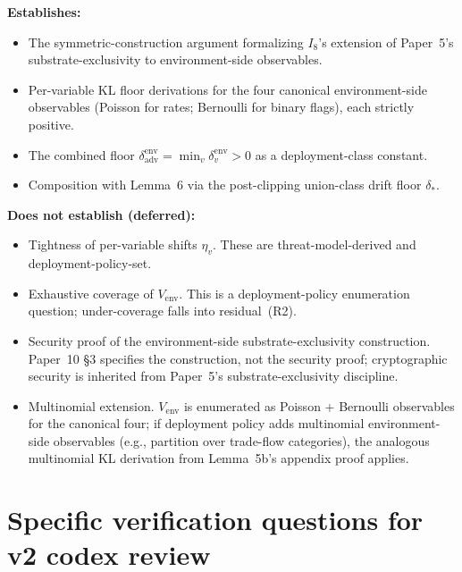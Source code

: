 \documentclass{article}
\newcommand{\deltaadv}{\delta_{\mathrm{adv}}}
\newcommand{\deltastar}{\delta_{*}}
\begin{document}
\textbf{Establishes:}
\begin{itemize}
\item The symmetric-construction argument formalizing $I_8$'s
  extension of Paper~5's substrate-exclusivity to environment-side
  observables.
\item Per-variable KL floor derivations for the four canonical
  environment-side observables (Poisson for rates; Bernoulli for
  binary flags), each strictly positive.
\item The combined floor $\deltaadv^{\mathrm{env}} = \min_v
  \delta_v^{\mathrm{env}} > 0$ as a deployment-class constant.
\item Composition with Lemma~6 via the post-clipping union-class
  drift floor $\deltastar$.
\end{itemize}

\textbf{Does not establish (deferred):}
\begin{itemize}
\item Tightness of per-variable shifts $\eta_v$.  These are
  threat-model-derived and deployment-policy-set.
\item Exhaustive coverage of $V_{\mathrm{env}}$.  This is a
  deployment-policy enumeration question; under-coverage falls into
  residual~(R2).
\item Security proof of the environment-side substrate-exclusivity
  construction.  Paper~10 §3 specifies the construction, not the
  security proof; cryptographic security is inherited from
  Paper~5's substrate-exclusivity discipline.
\item Multinomial extension.  $V_{\mathrm{env}}$ is enumerated as
  Poisson + Bernoulli observables for the canonical four; if
  deployment policy adds multinomial environment-side observables
  (e.g., partition over trade-flow categories), the analogous
  multinomial KL derivation from Lemma~5b's appendix proof applies.
\end{itemize}

\section{Specific verification questions for v2 codex review}
\end{document}
